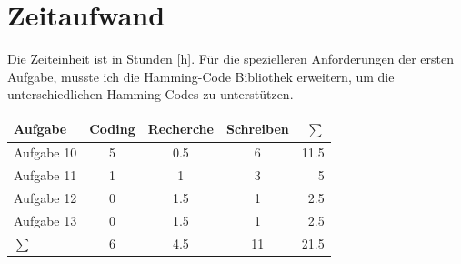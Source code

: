 \documentclass{article}
\begin{document}
    \section{Zeitaufwand}
    Die Zeiteinheit ist in Stunden [h]. Für die spezielleren Anforderungen der ersten Aufgabe, musste ich
    die Hamming-Code Bibliothek erweitern, um die unterschiedlichen Hamming-Codes zu unterstützen.
    \begin{table}[h]
        \begin{tabular}{l|ccc|r}
            Aufgabe & Coding & Recherche & Schreiben & $\sum$\\\hline
            Aufgabe 10 & 5 & 0.5 & 6  & 11.5 \\
            Aufgabe 11 & 1 & 1   & 3  & 5 \\
            Aufgabe 12 & 0 & 1.5 & 1  & 2.5 \\
            Aufgabe 13 & 0 & 1.5   & 1  & 2.5 \\\hline
            $\sum$     & 6 & 4.5   & 11 & 21.5
        \end{tabular}
    \end{table}
    
\end{document}
